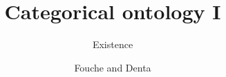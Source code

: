\documentclass{amsart}
\author{Fouche and Denta}
\title{Categorical ontology I}
\subtitle{Existence}
\begin{document}
\maketitle
\begin{abstract}

\end{abstract}
\tableofcontents





\appendix

\end{document}

